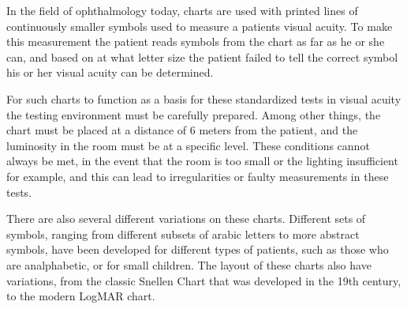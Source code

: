 

In the field of ophthalmology today, charts are used with printed lines of continuously smaller symbols used to measure a patients visual acuity. To make this measurement the patient reads symbols from the chart as far as he or she can, and based on at what letter size the patient failed to tell the correct symbol his or her visual acuity can be determined. 


For such charts to function as a basis for these standardized tests in visual acuity the testing environment must be carefully prepared. Among other things, the chart must be placed at a distance of 6 meters from the patient, and the luminosity in the room must be at a specific level. These conditions cannot always be met, in the event that the room is too small or the lighting insufficient for example, and this can lead to irregularities or faulty measurements in these tests. 


There are also several different variations on these charts. Different sets of symbols, ranging from different subsets of arabic letters to more abstract symbols, have been developed for different types of patients, such as those who are analphabetic, or for small children. The layout of these charts also have variations, from the classic Snellen Chart that was developed in the 19th century, to the modern LogMAR chart.

